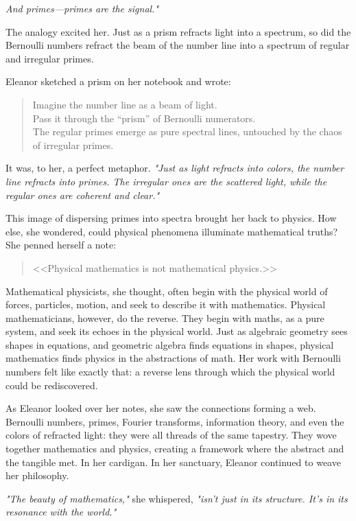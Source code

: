 \emph{And primes—primes are the signal."}

The analogy excited her. Just as a prism refracts light into a spectrum, so did the Bernoulli numbers refract the beam of the number line into a spectrum of regular and irregular primes.

Eleanor sketched a prism on her notebook and wrote:
\begin{quote}
Imagine the number line as a beam of light.\\
Pass it through the “prism” of Bernoulli numerators.\\
The regular primes emerge as pure spectral lines, untouched by the chaos of irregular primes.
\end{quote}

It was, to her, a perfect metaphor. \emph{"Just as light refracts into colors, the number line refracts into primes. The irregular ones are the scattered light, while the regular ones are coherent and clear."}

This image of dispersing primes into spectra brought her back to physics. How else, she wondered, could physical phenomena illuminate mathematical truths? She penned herself a note: 
\begin{quote}
<<Physical mathematics is not mathematical physics.>>
\end{quote}

Mathematical physicists, she thought, often begin with the physical world of forces, particles, motion, and seek to describe it with mathematics. Physical mathematicians, however, do the reverse. They begin with maths, as a pure system, and seek its echoes in the physical world. Just as algebraic geometry sees shapes in equations, and geometric algebra finds equations in shapes, physical mathematics finds physics in the abstractions of math. Her work with Bernoulli numbers felt like exactly that: a reverse lens through which the physical world could be rediscovered.

As Eleanor looked over her notes, she saw the connections forming a web. Bernoulli numbers, primes, Fourier transforms, information theory, and even the colors of refracted light: they were all threads of the same tapestry. They wove together mathematics and physics, creating a framework where the abstract and the tangible met. In her cardigan. In her sanctuary, Eleanor continued to weave her philosophy.

\emph{"The beauty of mathematics,"} she whispered, \emph{"isn’t just in its structure. It’s in its resonance with the world."}

